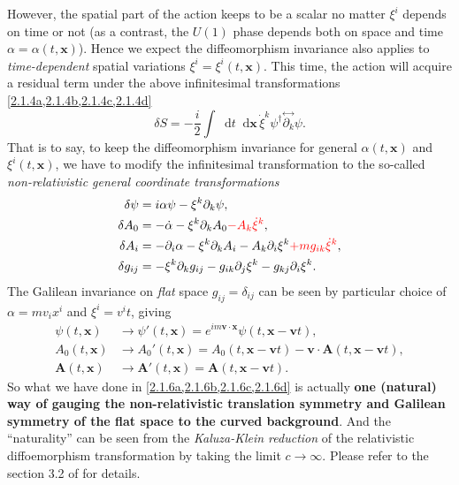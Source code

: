 \documentclass[10pt,nofootinbib,letterpaper]{revtex4}
\newcommand*\dd{\mathop{}\!\mathrm{d}}
\begin{document}
		However, the spatial part of the action keeps to be a scalar no matter $\xi^i$ depends on time or not (as a contrast, the $U(1)$ phase depends both on space and time $\alpha=\alpha(t,\bm{x})$). Hence we expect the diffeomorphism invariance also applies to \emph{time-dependent} spatial variations $\xi^i=\xi^i(t,\bm{x})$. This time, the action will acquire a residual term under the above infinitesimal transformations \cref{2.1.4a,2.1.4b,2.1.4c,2.1.4d}
		\begin{equation}\label{2.1.5}
			\delta S=-\dfrac{i}{2}\int\dd t\dd\bm{x}\,\dot{\xi}^k\psi^\dagger\overset{\leftrightarrow}{\partial_k}\psi.
		\end{equation}
		That is to say, to keep the diffeomorphism invariance for general $\alpha(t,\bm{x})$ and $\xi^i(t,\bm{x})$, we have to modify the infinitesimal transformation to the so-called \emph{non-relativistic general coordinate transformations} \cite{son2006general}
		\begin{subequations}
			\begin{align}
				\delta\psi&=i\alpha\psi-\xi^k \partial_k\psi,\label{2.1.6a}\\
				\delta A_0&=-\dot{\alpha}-\xi^k\partial_k A_0{\color{red}-A_k\dot{\xi}^k},\label{2.1.6b}\\
				\delta A_i&=-\partial_i \alpha-\xi^k \partial_k A_i-A_k \partial_i\xi^k{\color{red}+mg_{ik}\dot{\xi}^k},\label{2.1.6c}\\
				\delta g_{ij}&=-\xi^k\partial_k g_{ij}-g_{ik}\partial_j\xi^k-g_{kj}\partial_i\xi^k.\label{2.1.6d}
			\end{align}
		\end{subequations}
		The Galilean invariance on \emph{flat} space $g_{ij}=\delta_{ij}$ can be seen by particular choice of $\alpha=mv_ix^i$ and $\xi^i=v^it$, giving
		\begin{align*}
			\psi(t,\bm{x})&\to\psi'(t,\bm{x})=e^{im\bm{v\cdot x}}\psi(t,\bm{x}-\bm{v}t),\\
			A_0(t,\bm{x})&\to A_0'(t,\bm{x})=A_0(t,\bm{x}-\bm{v}t)-\bm{v}\cdot\bm{A}(t,\bm{x}-\bm{v}t),\\
			\bm{A}(t,\bm{x})&\to\bm{A'}(t,\bm{x})=\bm{A}(t,\bm{x}-\bm{v}t).
		\end{align*}
		So what we have done in \cref{2.1.6a,2.1.6b,2.1.6c,2.1.6d} is actually \textbf{one (natural) way of gauging the non-relativistic translation symmetry and Galilean symmetry of the flat space to the curved background}. And the ``naturality'' can be seen from the \emph{Kaluza-Klein reduction} of the relativistic diffoemorphism transformation by taking the limit $c\to\infty$. Please refer to the section 3.2 of \cite{son2006general} for details.
\end{document}
